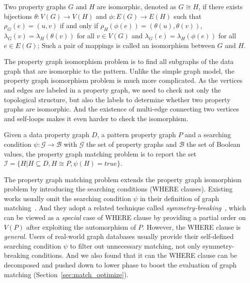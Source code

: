 \begin{definition}
  Two property graphs $G$ and $H$ are isomorphic, denoted as $G \cong H$,
  if there exists bijections $\theta: V(G) \rightarrow V(H)$ and $\phi: E(G) \rightarrow E(H)$ such that
  $\rho_G(e) = (u, v)$ if and only if $\rho_H(\phi(e)) = (\theta(u), \theta(v))$,
  $\lambda_G(v) = \lambda_H(\theta(v))$ for all $v \in V(G)$
  and $\lambda_G(e) = \lambda_H(\phi(e))$ for all $e \in E(G)$;
  Such a pair of mappings is called an isomorphism between $G$ and $H$.
\end{definition}
The property graph isomorphism problem is to find all subgraphs of the data graph that are isomorphic to the pattern.
Unlike the simple graph model, the property graph isomorphism problem is much more complicated.
As the vertices and edges are labeled in a property graph, we need to check  not only the topological structure,
but also the labels to determine whether two property graphs are isomorphic.
And the existence of multi-edge connecting two vertices and self-loops makes it even harder to check the isomorphism.
\begin{definition}\label{def:property_graph_matching}
  Given a data property graph $D$, a pattern property graph $P$ and a searching condition $\psi: \mathcal{G} \rightarrow \mathcal{B}$ with $\mathcal{G}$ the set of property graphs and $\mathcal{B}$ the set of Boolean values,
  the property graph matching problem is to report the set $\mathcal{I} = \{H | H \subseteq D, H \cong P, \psi(H) = true\}$.
\end{definition}
The property graph matching problem extends the property graph isomorphism problem by introducing the searching conditions (WHERE clauses).
Existing works usually omit the searching condition $\psi$ in their definition of graph matching~\cite{DBLP:conf/sigmod/ShaoCCMYX14,DBLP:journals/pvldb/LaiQLC15,DBLP:conf/sigmod/KimLBHLKJ16,DBLP:journals/pvldb/QiaoZC17}.
And they adopt a related technique called \emph{symmetry-breaking}~\cite{DBLP:conf/recomb/GrochowK07},
which can be viewed as a \emph{special} case of WHERE clause by providing a partial order on $V(P)$ after exploiting the automorphism of $P$.
However, the WHERE clause is \emph{general}. Users of real-world graph databases usually provide their self-defined searching condition $\psi$ to filter out unnecessary matching, not only symmetry-breaking conditions.
And we also found that it can the WHERE clause can be decomposed and pushed down to lower phase to boost the evaluation of graph matching (Section~\ref{sec:match_optimize}).
